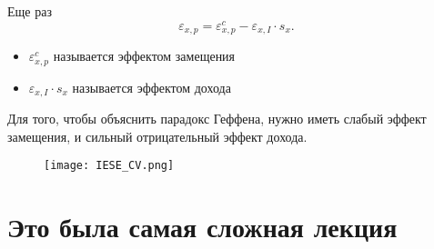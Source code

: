 \documentclass{beamer}
\begin{document}
\begin{frame}
Еще раз
$$\varepsilon_{x,p} = \varepsilon^c_{x,p} - \varepsilon_{x,I} \cdot s_{x}.$$

\begin{itemize}
\item $\varepsilon^c_{x,p}$ называется эффектом замещения
\item $\varepsilon_{x,I} \cdot s_{x}$ называется эффектом дохода
\end{itemize}

Для того, чтобы объяснить парадокс Геффена, нужно иметь слабый эффект замещения, и сильный отрицательный эффект дохода.

\end{frame}

\begin{frame}
\begin{figure}[hbt]
\centering
\texttt{[image: IESE\_CV.png]}
\end{figure}

\end{frame}

\section{Это была самая сложная лекция}
\end{document}
